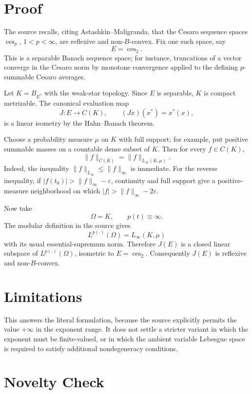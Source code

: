 \documentclass[11pt]{article}
\newcommand{\ces}{\operatorname{ces}}
\begin{document}
\section{Proof}

The source recalls, citing Astashkin--Maligranda, that the Cesaro sequence
spaces \(\ces_p\), \(1<p<\infty\), are reflexive and non-\(B\)-convex.  Fix
one such space, say
\[
  E=\ces_2.
\]
This is a separable Banach sequence space; for instance, truncations of a
vector converge in the Cesaro norm by monotone convergence applied to the
defining \(p\)-summable Cesaro averages.

Let \(K=B_{E^*}\) with the weak-star topology.  Since \(E\) is separable,
\(K\) is compact metrizable.  The canonical evaluation map
\[
  J:E\to C(K),\qquad (Jx)(x^*)=x^*(x),
\]
is a linear isometry by the Hahn--Banach theorem.

Choose a probability measure \(\mu\) on \(K\) with full support; for example,
put positive summable masses on a countable dense subset of \(K\).  Then for
every \(f\in C(K)\),
\[
  \|f\|_{C(K)}=\|f\|_{L_\infty(K,\mu)}.
\]
Indeed, the inequality \(\|f\|_{L_\infty}\le\|f\|_\infty\) is immediate.  For
the reverse inequality, if \(|f(t_0)|>\|f\|_\infty-\varepsilon\), continuity
and full support give a positive-measure neighborhood on which
\(|f|>\|f\|_\infty-2\varepsilon\).

Now take
\[
  \Omega=K,\qquad p(t)\equiv\infty.
\]
The modular definition in the source gives
\[
  L^{p(\cdot)}(\Omega)=L_\infty(K,\mu)
\]
with its usual essential-supremum norm.  Therefore \(J(E)\) is a closed
linear subspace of \(L^{p(\cdot)}(\Omega)\), isometric to \(E=\ces_2\).
Consequently \(J(E)\) is reflexive and non-\(B\)-convex.

\section{Limitations}

This answers the literal formulation, because the source explicitly permits
the value \(+\infty\) in the exponent range.  It does not settle a stricter
variant in which the exponent must be finite-valued, or in which the ambient
variable Lebesgue space is required to satisfy additional nondegeneracy
conditions.

\section{Novelty Check}
\end{document}

